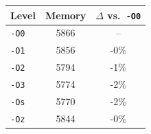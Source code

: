 \begin{tabular*}{\columnwidth}{@{\extracolsep\fill}lcc@{\extracolsep\fill}}
\toprule
\textbf{Level} & \textbf{Memory} & \textbf{$\Delta$ vs.\ \texttt{-O0}} \\
\midrule
\texttt{-O0} & 5866 & -- \\
\texttt{-O1} & 5856 & -0\% \\
\texttt{-O2} & 5794 & -1\% \\
\texttt{-O3} & 5774 & -2\% \\
\texttt{-Os} & 5770 & -2\% \\
\texttt{-Oz} & 5844 & -0\% \\
\bottomrule
\end{tabular*}
